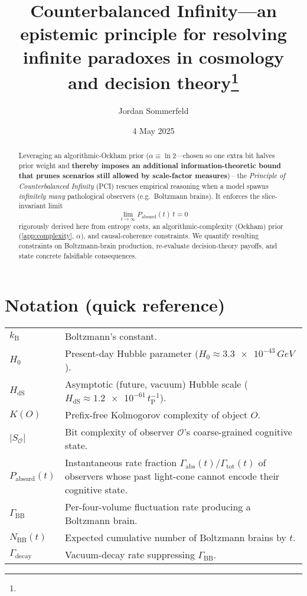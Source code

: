 \documentclass[12pt]{article}
\title{Counterbalanced Infinity---an epistemic principle for resolving infinite paradoxes in cosmology and decision theory\thanks{\DOI}}
\author{Jordan Sommerfeld}
\date{4 May 2025}
\newcommand{\KB}{k_\mathrm{B}}
\newcommand{\PCI}{PCI\xspace}
\begin{document}
\raggedbottom
\maketitle

\begin{abstract}\noindent
Leveraging an algorithmic‐Ockham prior
($\alpha\equiv\ln 2$—chosen so one extra bit halves prior weight and \textbf{thereby imposes an additional information-theoretic bound that prunes scenarios still allowed by scale-factor measures})\,– the \emph{Principle of Counterbalanced Infinity} (\PCI) rescues empirical
reasoning when a model spawns \emph{infinitely many} pathological observers (e.g.\ Boltzmann brains). It enforces the slice-invariant limit
\[
   \lim_{t\to\infty} P_{\text{absurd}}(t)\,t = 0
   \tag*{\PCI Limit}\label{eq:PCI-limit}
\]
rigorously derived here from entropy costs, an algorithmic-complexity (Ockham) prior
(\autoref{app:complexity}, $\alpha$), and causal-coherence constraints. We quantify resulting constraints on Boltzmann-brain production,
re-evaluate decision-theory payoffs, and state concrete falsifiable consequences.
\enlargethispage{\baselineskip}
\end{abstract}

\section*{Notation (quick reference)}
\renewcommand{\arraystretch}{1.2}
\begin{tabular}{@{}p{3.3cm}p{10cm}@{}}
$\KB$ & Boltzmann’s constant.\\
$H_0$ & Present-day Hubble parameter ($H_0\!\approx\!\num{3.3e-43}\,\si{GeV}$).\\
$H_{\mathrm{dS}}$ & Asymptotic (future, vacuum) Hubble scale
($H_{\mathrm{dS}}\!\approx\!\num{1.2e-61}\,t_{\mathrm P}^{-1}$).\\
$K(O)$ & Prefix-free Kolmogorov complexity of object $O.$\\
$\lvert S_{\mathcal O}\rvert$ & Bit complexity of observer $\mathcal O$’s coarse-grained cognitive state.\\
$P_{\text{absurd}}(t)$ & Instantaneous rate fraction $\Gamma_{\text{abs}}(t)/\Gamma_{\text{tot}}(t)$ of observers whose past light-cone cannot encode their cognitive state.\\
$\Gamma_{\text{BB}}$ & Per-four-volume fluctuation rate producing a Boltzmann brain.\\
$N_{\text{BB}}(t)$ & Expected cumulative number of Boltzmann brains by $t.$\\
$\Gamma_{\text{decay}}$ & Vacuum-decay rate suppressing $\Gamma_{\text{BB}}.$\\
\end{tabular}
\end{document}
